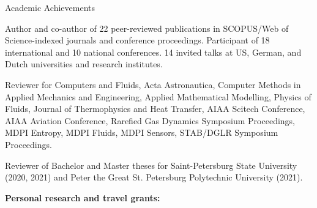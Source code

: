\documentclass{resume} %
\begin{document}
\begin{rSection}{Academic Achievements}

Author and co-author of 22 peer-reviewed publications in SCOPUS/Web of Science-indexed  journals and conference proceedings.
Participant of 18 international and 10 national conferences. 14 invited talks at US, German, and Dutch universities and research institutes.


Reviewer for Computers and Fluids, Acta Astronautica, Computer Methods in Applied Mechanics and Engineering, Applied Mathematical Modelling, Physics of Fluids, Journal of Thermophysics and Heat Transfer, AIAA Scitech Conference, AIAA Aviation Conference, Rarefied Gas Dynamics Symposium Proceedings,  MDPI Entropy, MDPI Fluids, MDPI Sensors, STAB/DGLR Symposium Proceedings.

Reviewer of Bachelor and Master theses for Saint-Petersburg State University (2020, 2021) and Peter the Great St. Petersburg Polytechnic University (2021).

{\bf Personal research and travel grants:}


\begin{enumerate}


\end{enumerate}
\end{rSection}
\end{document}
